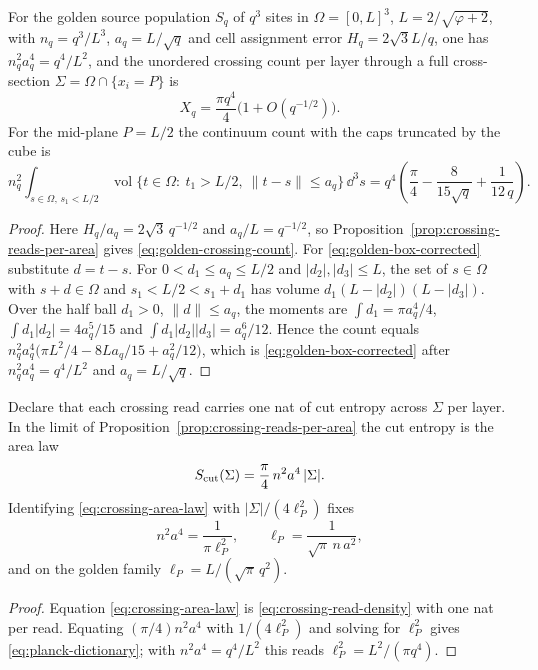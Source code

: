 \begin{corollary}
\label{cor:golden-crossing-count}
For the golden source population $S_q$ of $q^3$ sites in
$\Omega=[0,L]^3$, $L=2/\sqrt{\varphi+2}$, with $n_q=q^3/L^3$,
$a_q=L/\sqrt q$ and cell assignment error $H_q=2\sqrt3L/q$, one has
$n_q^2a_q^4=q^4/L^2$, and the unordered crossing count per layer through
a full cross-section $\Sigma=\Omega\cap\{x_i=P\}$ is
\begin{equation}
 X_q=\frac{\pi q^4}{4}\bigl(1+O(q^{-1/2})\bigr).
 \label{eq:golden-crossing-count}
\end{equation}
For the mid-plane $P=L/2$ the continuum count with the caps truncated by
the cube is
\begin{equation}
 n_q^2\int_{s\in\Omega,\,s_1<L/2}
 \operatorname{vol}\{t\in\Omega:\ t_1>L/2,\ \|t-s\|\leq a_q\}\,\dd^3s
 =q^4\left(\frac{\pi}{4}-\frac{8}{15\sqrt q}+\frac1{12\,q}\right).
 \label{eq:golden-box-corrected}
\end{equation}
\end{corollary}
\begin{proof}
Here $H_q/a_q=2\sqrt3\,q^{-1/2}$ and $a_q/L=q^{-1/2}$, so
Proposition~\ref{prop:crossing-reads-per-area} gives
\eqref{eq:golden-crossing-count}. For \eqref{eq:golden-box-corrected}
substitute $d=t-s$. For $0<d_1\leq a_q\leq L/2$ and $|d_2|,|d_3|\leq L$,
the set of $s\in\Omega$ with $s+d\in\Omega$ and $s_1<L/2<s_1+d_1$ has
volume $d_1(L-|d_2|)(L-|d_3|)$. Over the half ball $d_1>0$,
$\|d\|\leq a_q$, the moments are $\int d_1=\pi a_q^4/4$,
$\int d_1|d_2|=4a_q^5/15$ and $\int d_1|d_2||d_3|=a_q^6/12$. Hence the
count equals $n_q^2a_q^4\bigl(\pi L^2/4-8La_q/15+a_q^2/12\bigr)$, which is
\eqref{eq:golden-box-corrected} after $n_q^2a_q^4=q^4/L^2$ and
$a_q=L/\sqrt q$.
\end{proof}

\begin{proposition}
\label{prop:planck-area-dictionary}
Declare that each crossing read carries one nat of cut entropy across
$\Sigma$ per layer. In the limit of
Proposition~\ref{prop:crossing-reads-per-area} the cut entropy is the area
law
\begin{equation}
 S_{\mathrm{cut}}(\Sigma)=\frac{\pi}{4}\,n^2a^4\,|\Sigma| .
 \label{eq:crossing-area-law}
\end{equation}
Identifying \eqref{eq:crossing-area-law} with $|\Sigma|/(4\ell_P^2)$ fixes
\begin{equation}
 n^2a^4=\frac1{\pi\ell_P^2},\qquad
 \ell_P=\frac1{\sqrt\pi\,n\,a^2},
 \label{eq:planck-dictionary}
\end{equation}
and on the golden family $\ell_P=L/(\sqrt\pi\,q^2)$.
\end{proposition}
\begin{proof}
Equation \eqref{eq:crossing-area-law} is \eqref{eq:crossing-read-density} with
one nat per read. Equating $(\pi/4)n^2a^4$ with $1/(4\ell_P^2)$ and
solving for $\ell_P^2$ gives \eqref{eq:planck-dictionary}; with
$n^2a^4=q^4/L^2$ this reads $\ell_P^2=L^2/(\pi q^4)$.
\end{proof}

